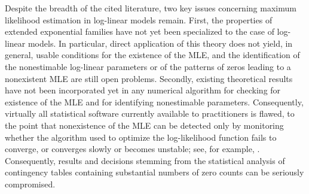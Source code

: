 \documentclass[aos,MSNbibl,nameyear,dvips]{arximspdf}
\begin{document}
Despite the breadth of the cited literature, two key issues concerning
maximum likelihood estimation in log-linear models remain. First, the
properties of extended exponential families have not yet been
specialized to the case of log-linear models. In particular, direct
application of this theory does not yield, in general, usable
conditions for the existence of the MLE, and the identification of the
nonestimable log-linear parameters or of the patterns of zeros leading
to a nonexistent MLE are still open problems. Secondly, existing
theoretical results have not been incorporated yet in any numerical
algorithm for checking for existence of the MLE and for identifying
nonestimable parameters. Consequently, virtually all statistical
software currently available to practitioners is flawed, to the point
that nonexistence of the MLE can be detected only by monitoring whether
the algorithm used to optimize the log-likelihood function fails to
converge, or converges slowly or becomes unstable; see, for example,
\citet{ROY05}. Consequently, results and decisions stemming from the
statistical analysis of contingency tables containing substantial
numbers of zero counts can be seriously compromised.
\end{document}
